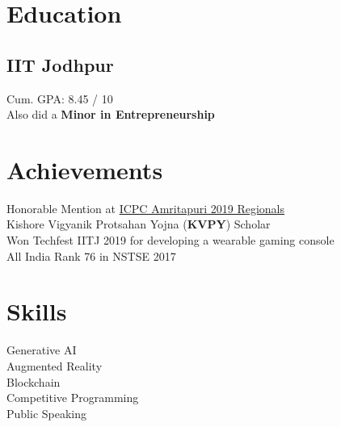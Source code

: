 \documentclass[]{deedy-resume-openfont}
\begin{document}
%
%
\lastupdated

%
%

%
%

\begin{minipage}[t]{0.33\textwidth} 


\section{Education} 

\subsection{IIT Jodhpur}
Cum. GPA: 8.45 / 10\\
Also did a \textbf{Minor in Entrepreneurship}


\sectionsep
\section{Achievements} 
\textbullet{} Honorable Mention at \href{https://icpc.global/ICPCID/SV747893JYP7}{ICPC Amritapuri 2019 Regionals \small{\faExternalLink}}\\
\textbullet{} Kishore Vigyanik Protsahan Yojna (\textbf{KVPY}) Scholar\\
\textbullet{} Won Techfest IITJ 2019 for developing a wearable gaming console\\
\textbullet{} All India Rank 76 in NSTSE 2017

\sectionsep
\section{Skills}
\textbullet{} Generative AI \\
\textbullet{} Augmented Reality \\
\textbullet{} Blockchain \\
\textbullet{} Competitive Programming \\ 
\textbullet{} Public Speaking


\end{minipage}
\end{document}
